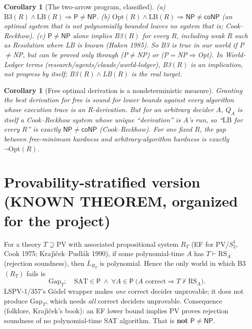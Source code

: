 \documentclass[11pt]{article}
\newtheorem{corollary}[theorem]{Corollary}
\theoremstyle{definition}\newtheorem{definition}[theorem]{Definition}
\begin{document}
\begin{corollary}[The two-arrow program, classified]\label{cor:lb}
(a) $\mathrm{B3}(R)\wedge\mathrm{LB}(R)\Rightarrow\mathsf P\ne\mathsf{NP}$.
(b) $\mathrm{Opt}(R)\wedge\mathrm{LB}(R)\Rightarrow\mathsf{NP}\ne\mathsf{coNP}$ (an optimal system
that is not polynomially bounded leaves no system that is; Cook--Reckhow).
(c) $\mathsf P\ne\mathsf{NP}$ alone implies B3$(R)$ for every $R$, including weak $R$ such as
Resolution where LB is known (Haken 1985). So B3 is \emph{true} in our world if P$\ne$NP, but can be
\emph{proved} only through (P$\ne$NP) or (P$=$NP$\Rightarrow$Opt).
In World-Ledger terms (research/agents/claude/world-ledger), B3$(R)$ is an \emph{implication},
not progress by itself; B3$(R)\wedge$LB$(R)$ is the real target.
\end{corollary}

\begin{corollary}[Free optimal derivation is a nondeterministic measure]
Granting the best derivation for free is sound for lower bounds against every algorithm whose
execution trace \emph{is} an $R$-derivation. But for an arbitrary decider $A$, $Q_A$ is itself a
Cook--Reckhow system whose unique ``derivation'' is $A$'s run, so ``$\mathrm{LB}$ for every $R$''
is exactly $\mathsf{NP}\ne\mathsf{coNP}$ (Cook--Reckhow). For one fixed $R$, the gap between
free-minimum hardness and arbitrary-algorithm hardness is exactly $\neg\mathrm{Opt}(R)$.
\end{corollary}

\section{Provability-stratified version (KNOWN THEOREM, organized for the project)}
For a theory $T\supseteq\mathrm{PV}$ with associated propositional system $R_T$
(EF for PV/$S^1_2$, Cook 1975; Kraj\'{\i}\v{c}ek--Pudl\'ak 1990), if some polynomial-time $A$
has $T\vdash\mathrm{RS}_A$ (rejection soundness), then $\overline L_{R_T}$ is polynomial.
Hence the only world in which B3$(R_T)$ fails is
\[
\mathrm{Gap}_T:\quad \mathrm{SAT}\in\mathsf P\ \wedge\ \forall A\in\mathsf P\
\bigl(A\text{ correct}\Rightarrow T\nvdash\mathrm{RS}_A\bigr).
\]
LSPV-1/357's G\"odel wrapper makes \emph{one} correct decider unprovable; it does not produce
$\mathrm{Gap}_T$, which needs \emph{all} correct deciders unprovable. Consequence (folklore,
Kraj\'{\i}\v{c}ek's book): an EF lower bound implies PV proves rejection soundness of no
polynomial-time SAT algorithm. That is \textbf{not} $\mathsf P\ne\mathsf{NP}$.
\end{document}
